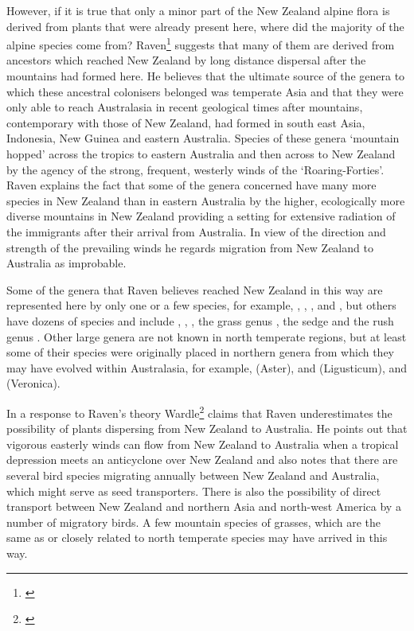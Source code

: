 However, if it is true that only a minor part of the New Zealand alpine flora is derived from plants that were already present here, where did the majority of the alpine species come from? Raven\footnote{\cite{raven1973evolution}} suggests that many of them are derived from ancestors which reached New Zealand by long distance dispersal after the mountains had formed here.
He believes that the ultimate source of the genera to which these ancestral colonisers belonged was temperate Asia and that they were only able to reach Australasia in recent geological times after mountains, contemporary with those of New Zealand, had formed in south east Asia, Indonesia, New Guinea and eastern Australia.
Species of these genera `mountain hopped' across the tropics to eastern Australia and then across to New Zealand by the agency of the strong, frequent, westerly winds of the `Roaring-Forties'.
Raven explains the fact that some of the genera concerned have many more species in New Zealand than in eastern Australia by the higher, ecologically more diverse mountains in New Zealand providing a setting for extensive radiation of the immigrants after their arrival from Australia.
In view of the direction and strength of the prevailing winds he regards migration from New Zealand to Australia as improbable.

Some of the genera that Raven believes reached New Zealand in this way are represented here by only one or a few species, for example, , , ,  and , but others have dozens of species and include , , , the grass genus , the sedge  and the rush genus .
Other large genera are not known in north temperate regions, but at least some of their species were originally placed in northern genera from which they may have evolved within Australasia, for example,  (Aster),  and  (Ligusticum), and  (Veronica).

In a response to Raven's theory Wardle\footnote{\cite{wardle1978origin}} claims that Raven underestimates the possibility of plants dispersing from New Zealand to Australia.
He points out that vigorous easterly winds can flow from New Zealand to Australia when a tropical depression meets an anticyclone over New Zealand and also notes that there are several bird species migrating annually between New Zealand and Australia, which might serve as seed transporters.
There is also the possibility of direct transport between New Zealand and northern Asia and north-west America by a number of migratory birds.
A few mountain species of grasses, which are the same as or closely related to north temperate species may have arrived in this way.

